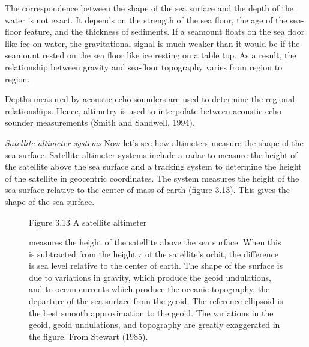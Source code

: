 The correspondence between the shape of the sea surface and the depth
of the water is not exact. It depends on the strength of the sea
floor, the age of the sea-floor feature, and the thickness of
sediments. If a seamount floats on the sea floor like ice on water,
the gravitational signal is much weaker than it would be if the
seamount rested on the sea floor like ice resting on a table top. As a
result, the relationship between gravity and sea-floor topography
varies from region to region.

Depths measured by acoustic echo sounders are used to determine the
regional relationships. Hence, altimetry is used to interpolate
between acoustic echo sounder measurements (Smith and Sandwell, 1994).

\textit{Satellite-altimeter systems} Now let's see how altimeters measure the
shape of the sea surface. Satellite altimeter systems include a radar
to measure the height of the satellite above the sea surface and a
tracking system to determine the height of the satellite in geocentric
coordinates. The system measures the height of the sea surface
relative to the center of mass of earth (figure 3.13). This gives the
shape of the sea surface.

\begin{figure}[t!]
\footnotesize
Figure 3.13 A satellite altimeter \rule{0mm}{3ex}measures the height
of the satellite above the sea surface. When this is subtracted from
the height $r$ of the satellite's orbit, the difference is sea level
relative to the center of earth. The shape of the surface is due to
variations in gravity, which produce the geoid
undulations, and to ocean currents which
produce the oceanic topography, the departure of the sea surface from
the geoid. The reference ellipsoid is the best smooth
approximation to the geoid. The variations in the geoid, geoid
undulations, and topography are greatly exaggerated in the
figure. From Stewart (1985).
\label{fig:altimetersketch}
\vspace{-4ex}
\end{figure}

